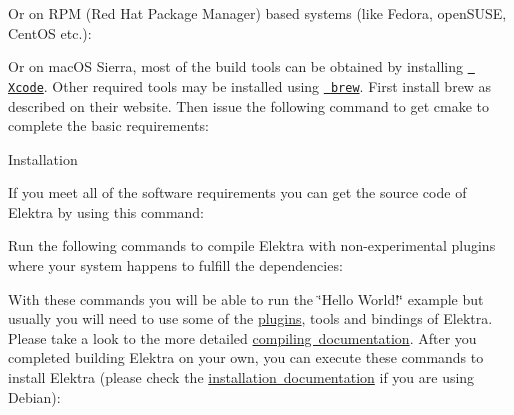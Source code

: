 Or on R\+PM (Red Hat Package Manager) based systems (like Fedora, open\+S\+U\+SE, Cent\+OS etc.)\+:


\begin{DoxyCode}{0}
\end{DoxyCode}


Or on mac\+OS Sierra, most of the build tools can be obtained by installing \href{https://developer.apple.com/xcode/}{\texttt{ Xcode}}. Other required tools may be installed using \href{https://brew.sh/}{\texttt{ brew}}. First install brew as described on their website. Then issue the following command to get cmake to complete the basic requirements\+:


\begin{DoxyCode}{0}
\end{DoxyCode}



\begin{DoxyItemize}
\item Installation

If you meet all of the software requirements you can get the source code of Elektra by using this command\+:
\end{DoxyItemize}


\begin{DoxyCode}{0}
\end{DoxyCode}


Run the following commands to compile Elektra with non-\/experimental plugins where your system happens to fulfill the dependencies\+:


\begin{DoxyCode}{0}
\end{DoxyCode}


With these commands you will be able to run the \char`\"{}\+Hello World!\char`\"{} example but usually you will need to use some of the \mbox{\hyperlink{src_plugins_README_md}{plugins}}, tools and bindings of Elektra. Please take a look to the more detailed \mbox{\hyperlink{doc_COMPILE_md}{compiling documentation}}. After you completed building Elektra on your own, you can execute these commands to install Elektra (please check the \mbox{\hyperlink{doc_INSTALL_md}{installation documentation}} if you are using Debian)\+:



